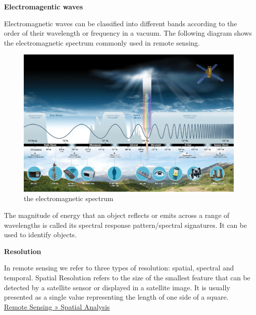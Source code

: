 \documentclass[
  letterpaper,
  DIV=11,
  numbers=noendperiod]{scrreprt}
\begin{document}
\textbf{Electromagentic waves}

Electromagnetic waves can be classified into different bands according
to the order of their wavelength or frequency in a vacuum. The following
diagram shows the electromagnetic spectrum commonly used in remote
sensing.

\begin{figure}

{\centering \includegraphics{./image/Diagram of the Electromagnetic Spectrum.jpeg}

}

\caption{the electromagnetic spectrum}

\end{figure}

\begin{tcolorbox}[enhanced jigsaw, title=\textcolor{quarto-callout-tip-color}{\faLightbulb}\hspace{0.5em}{Tip}, coltitle=black, opacitybacktitle=0.6, toprule=.15mm, leftrule=.75mm, opacityback=0, arc=.35mm, breakable, colbacktitle=quarto-callout-tip-color!10!white, colback=white, bottomrule=.15mm, bottomtitle=1mm, toptitle=1mm, titlerule=0mm, rightrule=.15mm, left=2mm, colframe=quarto-callout-tip-color-frame]
The magnitude of energy that an object reflects or emits across a range
of wavelengths is called its spectral response pattern/spectral
signatures. It can be used to identify objects.
\end{tcolorbox}

\textbf{Resolution}

In remote sensing we refer to three types of resolution: spatial,
spectral and temporal. Spatial Resolution refers to the size of the
smallest feature that can be detected by a satellite sensor or displayed
in a satellite image. It is usually presented as a single value
representing the length of one side of a square.
\href{https://cimss.ssec.wisc.edu/sage/remote_sensing/lesson3/concepts.html}{Remote
Sensing » Spatial Analysis}
\end{document}
